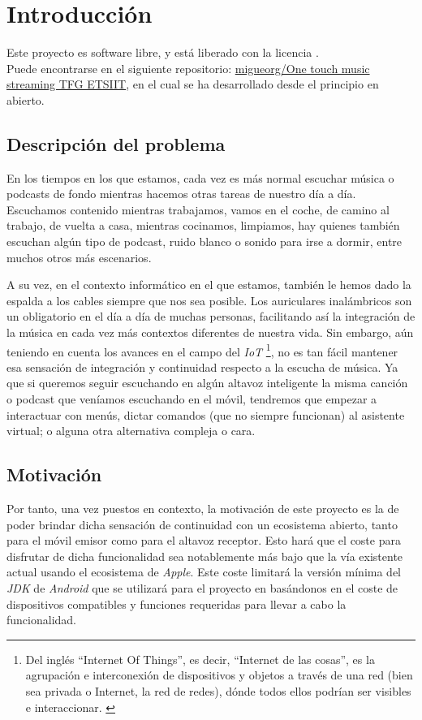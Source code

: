 \chapter{Introducción}

Este proyecto es software libre, y está liberado con la licencia \cite{gplv3}.\\

Puede encontrarse en el siguiente repositorio:
\href{https://github.com/migueorg/One-touch-music-streaming-TFG-ETSIIT/}{migueorg/One touch music streaming TFG ETSIIT}, 
en el cual se ha desarrollado desde el principio en abierto.

\section{Descripción del problema}
En los tiempos en los que estamos, cada vez es más normal escuchar música o
podcasts de fondo mientras hacemos otras tareas de nuestro día a día. Escuchamos
contenido mientras trabajamos, vamos en el coche, de camino al trabajo, de
vuelta a casa, mientras cocinamos, limpiamos, hay quienes también escuchan algún
tipo de podcast, ruido blanco o sonido para irse a dormir, entre muchos otros
más escenarios. 

A su vez, en el contexto informático en el que estamos, también le hemos dado la
espalda a los cables siempre que nos sea posible. Los auriculares inalámbricos
son un obligatorio en el día a día de muchas personas, facilitando así la
integración de la música en cada vez más contextos diferentes de nuestra vida.
Sin embargo, aún teniendo en cuenta los avances en el campo del \emph{IoT}
\footnote{Del inglés ``Internet Of Things'', es decir, ``Internet de las cosas'', es
la agrupación e interconexión de dispositivos y objetos a través de una red
(bien sea privada o Internet, la red de redes), dónde todos ellos podrían ser
visibles e interaccionar. \cite{IoT}}, no es tan fácil mantener esa sensación de
integración y continuidad respecto a la escucha de música. Ya que si queremos
seguir escuchando en algún altavoz inteligente la misma canción o podcast que
veníamos escuchando en el móvil, tendremos que empezar a interactuar con menús,
dictar comandos (que no siempre funcionan) al asistente virtual; o alguna otra
alternativa compleja o cara.\\

\section{Motivación}
Por tanto, una vez puestos en contexto, la motivación de este proyecto es la de
poder brindar dicha sensación de continuidad con un ecosistema abierto, tanto
para el móvil emisor como para el altavoz receptor. Esto hará que el coste para
disfrutar de dicha funcionalidad sea notablemente más bajo que la vía existente
actual usando el ecosistema de \emph{Apple}. Este coste limitará la versión
mínima del \emph{JDK} de \emph{Android} que se utilizará para el proyecto en
basándonos en el coste de dispositivos compatibles y funciones requeridas para
llevar a cabo la funcionalidad.

